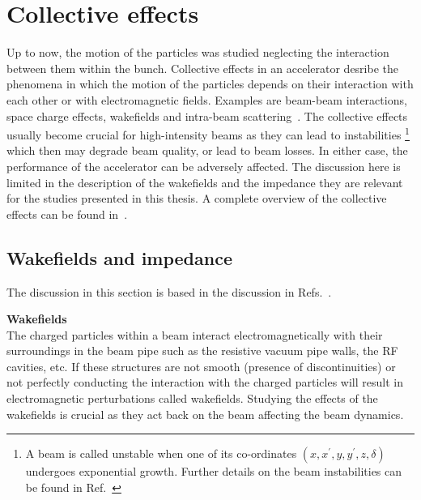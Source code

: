 \section{Collective effects}\label{sec:collective_effects}
Up to now, the motion of the particles was studied neglecting the interaction between them within the bunch. Collective effects in an accelerator desribe the phenomena in which the motion of the particles depends on their interaction with each other or with electromagnetic fields. Examples are beam-beam interactions, space charge effects, wakefields and intra-beam scattering~\cite{Zimmermann:2264408}. The collective effects usually become crucial for high-intensity beams as they can lead to instabilities \footnote{A beam is called unstable when one of its co-ordinates $(x, x^\prime, y, y^\prime, z, \delta)$ undergoes exponential growth. Further details on the beam instabilities can be found in Ref.~\cite{Rumolo:1982422}} which then may degrade beam quality, or lead to beam losses.  In either case, the performance of the accelerator can be adversely affected. The discussion here is limited in the description of the wakefields and the impedance they are relevant for the studies presented in this thesis. A complete overview of the collective effects can be found in~\cite{wolski2014, Zimmermann:2264408}.

\subsection{Wakefields and impedance}\label{subsec:wakefields}
The discussion in this section is based in the discussion in Refs.~\cite{wolski2014, Rumolo:1982422, instabilities_rumulo_li, benoit_ipac19_impedance, Chao:collective}.

\textbf{Wakefields}\\
The charged particles within a beam interact electromagnetically with their surroundings in the beam pipe such as the resistive vacuum pipe walls, the RF cavities, etc. If these structures are not smooth (presence of discontinuities) or not perfectly conducting the interaction with the charged particles will result in electromagnetic perturbations called wakefields. Studying the effects of the wakefields is crucial as they act back on the beam affecting the beam dynamics.

